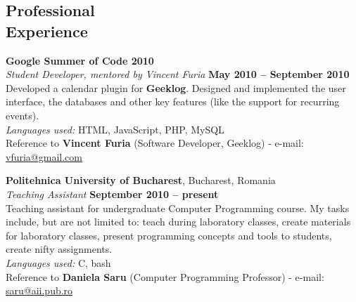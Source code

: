 \documentclass[margin,line]{resume}
\begin{document}
\begin{resume}
    \section{\mysidestyle Professional\\Experience}

    \textbf{Google Summer of Code 2010}\vspace{1.5mm}\\
	\vspace{1mm} \textsl{Student Developer, mentored by Vincent Furia} \hfill \textbf{May 2010 -- September 2010}\\
    Developed a calendar plugin for \textbf{Geeklog}. Designed and implemented the user interface, the databases and 
	other key features (like the support for recurring events).	\vspace{1.5mm}\\
	\textit{Languages used:} HTML, JavaScript, PHP, MySQL 	\vspace{1.5mm}\\
	\small{Reference to \textbf{Vincent Furia} (Software Developer, Geeklog) - e-mail: \href{mailto:vfuria@gmail.com}{vfuria@gmail.com}}

    \vspace{1.5mm}\textbf{Politehnica University of Bucharest}, Bucharest, Romania \vspace{1.5mm}\\
	\vspace{1mm} \textsl{Teaching Assistant} \hfill \textbf{September 2010 -- present}\\
    Teaching assistant for undergraduate Computer Programming course.
    My tasks include, but are not limited to: teach during laboratory classes, create 
	materials for laboratory classes, present programming concepts and tools to 
	students, create nifty assignments.\vspace{1.5mm}\\
	\textit{Languages used:} C, bash\vspace{1.5mm}\\
	\small{Reference to \textbf{Daniela Saru} (Computer Programming Professor) - e-mail: \href{mailto:saru@aii.pub.ro}{saru@aii.pub.ro}}


\end{resume}
\end{document}
